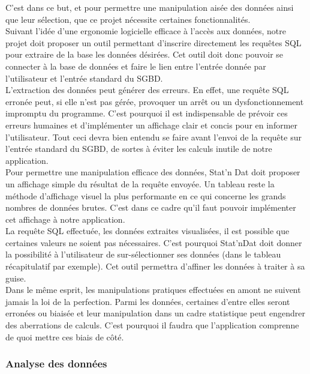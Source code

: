 \documentclass[a4paper,10pt]{report}
\begin{document}
C’est dans ce but, et pour permettre une manipulation aisée des données ainsi que leur sélection, que ce projet nécessite certaines fonctionnalités.\\
Suivant l’idée d’une ergonomie logicielle efficace à l’accès aux données, notre projet doit proposer un outil permettant d’inscrire directement les requêtes SQL pour extraire de la base les données désirées. Cet outil doit donc pouvoir se connecter à la base de données et faire le lien entre l’entrée donnée par l’utilisateur et l’entrée standard du SGBD. \\

L’extraction des données peut générer des erreurs. En effet, une requête SQL erronée peut, si elle n’est pas gérée, provoquer un arrêt ou un dysfonctionnement impromptu du programme. C’est pourquoi il est indispensable de prévoir ces erreurs humaines et d’implémenter un affichage clair et concis pour en informer l’utilisateur. Tout ceci devra bien entendu se faire avant l’envoi de la requête sur l’entrée standard du SGBD, de sortes à éviter les calculs inutile de notre application.\\

Pour permettre une manipulation efficace des données, Stat’n Dat doit proposer un affichage simple du résultat de la requête envoyée. Un tableau reste la méthode d’affichage visuel la plus performante en ce qui concerne les grands nombres de données brutes. C’est dans ce cadre qu’il faut pouvoir implémenter cet affichage à notre application. \\

La requête SQL effectuée, les données extraites visualisées, il est possible que certaines valeurs ne  soient pas nécessaires. C’est pourquoi Stat’nDat doit donner la possibilité à l’utilisateur de sur-sélectionner ses données (dans le tableau récapitulatif par exemple). Cet outil permettra d’affiner les données à traiter à sa guise.\\

Dans le même esprit, les manipulations pratiques effectuées en amont ne suivent jamais la loi de la perfection. Parmi les données, certaines d’entre elles seront erronées ou biaisée et leur manipulation dans un cadre statistique peut engendrer des aberrations de calculs. C’est pourquoi il faudra que l’application comprenne de quoi mettre ces biais de côté.


\subsubsection{Analyse des données}
\end{document}
